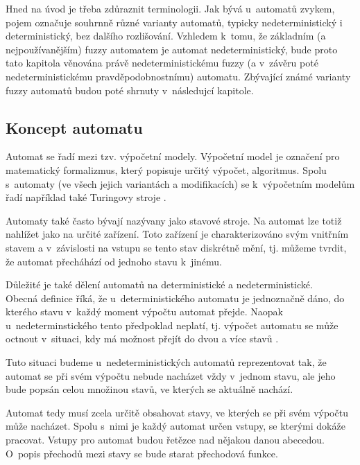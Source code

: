 Hned na úvod je třeba zdůraznit terminologii. Jak bývá u~automatů zvykem, pojem  označuje souhrnně různé varianty automatů, typicky nedeterministický i deterministický, bez dalšího rozlišování. Vzhledem k~tomu, že základním (a nejpoužívanějším) fuzzy automatem je automat nedeterministický, bude proto tato kapitola věnována právě nedeterministickému fuzzy (a v~závěru poté nedeterministickému pravděpodobnostnímu) automatu. Zbývající známé varianty fuzzy automatů budou poté shrnuty v~následujcí kapitole.


\subsection{Koncept automatu}
Automat se řadí mezi tzv. výpočetní modely. Výpočetní model je označení pro matematický formalizmus, který popisuje určitý výpočet, algoritmus. Spolu s~automaty (ve všech jejich variantách a modifikacích) se k~výpočetním modelům řadí například také Turingovy stroje \cite{MorMal-FuzzyAutLang}. 

Automaty také často bývají nazývany jako stavové stroje. Na automat lze totiž nahlížet jako na určité zařízení. Toto zařízení je charakterizováno svým vnitřním stavem a v~závislosti na vstupu se tento stav diskrétně mění, tj. můžeme tvrdit, že automat přecháhází od jednoho stavu k~jinému.

Důležité je také dělení automatů na deterministické a nedeterministické. \\ Obecná definice říká, že u~deterministického automatu je jednoznačně dáno, do kterého stavu v~každý moment výpočtu automat přejde. Naopak u~nedeterminstického tento předpoklad neplatí, tj. výpočet automatu se může octnout v~situaci, kdy má možnost přejít do dvou a více stavů .

Tuto situaci budeme u~nedeterministických automatů reprezentovat tak, že automat se při svém výpočtu nebude nacházet vždy v~jednom stavu, ale jeho  bude popsán celou množinou stavů, ve kterých se aktuálně nachází.

Automat tedy musí zcela určitě obsahovat stavy, ve kterých se při svém výpočtu může nacházet. Spolu s~nimi je každý automat určen vstupy, se kterými dokáže pracovat. Vstupy pro automat budou řetězce nad nějakou danou abecedou. O~popis přechodů mezi stavy se bude starat přechodová funkce.

